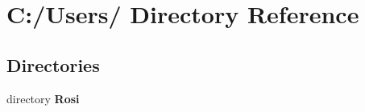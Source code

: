 \section{C:/Users/ Directory Reference}
\label{dir_C_3A_2FUsers_2F}


\subsection*{Directories}
\begin{CompactItemize}
\item 
directory {\bf Rosi}
\end{CompactItemize}
